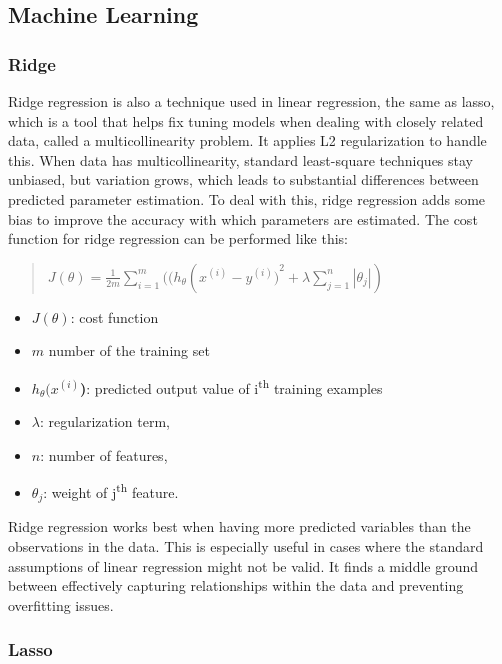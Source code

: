 \subsection{Machine Learning}

\subsubsection{Ridge}
Ridge regression is also a technique used in linear regression, the same as lasso, which is a tool that helps fix tuning models when dealing with closely related data, called a multicollinearity problem\cite{ridge}. It applies L2 regularization to handle this. When data has multicollinearity, standard least-square techniques stay unbiased, but variation grows, which leads to substantial differences between predicted parameter estimation. To deal with this, ridge regression adds some bias to improve the accuracy with which parameters are estimated.
The cost function for ridge regression can be performed like this: 
\begin{quote}
    
    \(J(\theta) = \frac{1}{2m}\sum_{i=1}^{m}((h_{\theta}(x^{(i)} - {y^{(i)})}^{2} + \lambda\sum_{j=1}^{n}\left| \theta_{j} \right|)\)
\end{quote}
    
\begin{itemize}
    \item \(J(\theta)\): cost function
    \item \(m\) number of the training set
    \item \(h_{\theta}(x^{(i)}\)\textbf{)}: predicted output value of
    i\textsuperscript{th} training examples
    \item \(\lambda\): regularization term,
    \item \(n\): number of features,
    \item \(\theta_{j}\): weight of j\textsuperscript{th} feature.

\end{itemize}

Ridge regression works best when having more predicted variables than the observations in the data. This is especially useful in cases where the standard assumptions of linear regression might not be valid. It finds a middle ground between effectively capturing relationships within the data and preventing overfitting issues. 

\subsubsection{Lasso}

